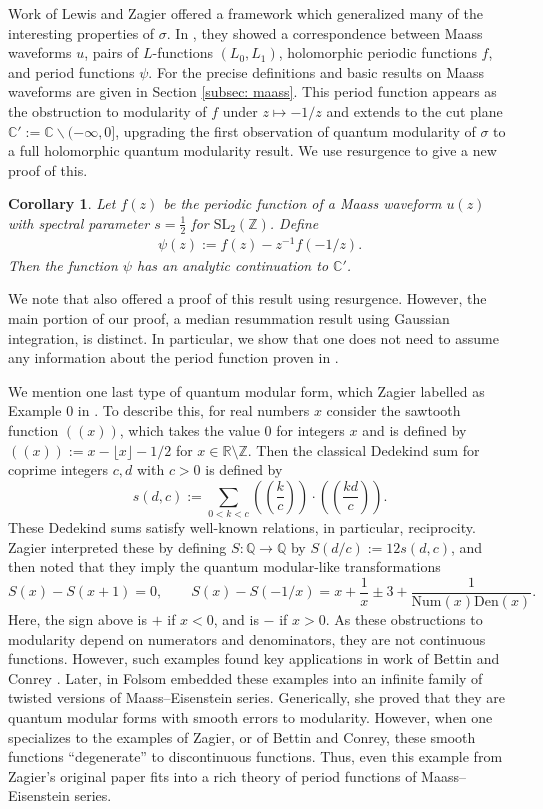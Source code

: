 \documentclass[12pt]{amsart}
\theoremstyle{definition}
\theoremstyle{plain}
\newtheorem{cor}[theorem]{Corollary}
\newcommand{\Z}{\mathbb{Z}}
\newcommand{\Q}{\mathbb{Q}}
\newcommand{\R}{\mathbb{R}}
\numberwithin{equation}{section}
\begin{document}
Work of Lewis and Zagier offered a framework which generalized many of the interesting properties of $\sigma$. In \cite{lewis-zagier}, they showed a correspondence between Maass waveforms $u$, pairs of $L$-functions $(L_0,L_1)$, holomorphic periodic functions $f$, and period functions $\psi$. For the precise definitions and basic results on Maass waveforms are given in Section \ref{subsec: maass}. This period function appears as the obstruction to modularity of $f$ under $z \mapsto -1/z$ and extends to the cut plane $\mathbb{C}':=\mathbb{C}\backslash (-\infty,0]$, upgrading the first observation of quantum modularity of $\sigma$ to a full holomorphic quantum modularity result. We use resurgence to give a new proof of this.

\begin{cor}
Let $f(z)$ be the periodic function of a Maass waveform $u(z)$ with spectral parameter $s= \frac{1}{2}$ for $\mathrm{SL}_2(\mathbb{Z})$. Define
\begin{align*}
	\psi(z):= f(z)  -  z^{-1}f(-1/z). 
\end{align*}
	Then the function $\psi$ has an analytic continuation to $\mathbb{C}'$. 
\end{cor}

We note that \cite{fantini-rella} also offered a proof of this result using resurgence. However, the main portion of our proof, a median resummation result using Gaussian integration, is distinct. In particular, we show that one does not need to assume any information about the period function proven in \cite{lewis-zagier}. 

We mention one last type of quantum modular form, which Zagier labelled as Example 0 in \cite{zagier-quantum}. To describe this, for real numbers $x$ consider the sawtooth function $((x))$, which takes the value $0$ for integers $x$ and is defined by $((x)):=x-\lfloor x\rfloor-1/2$ for $x\in\R\setminus\Z$. Then the classical Dedekind sum for coprime integers $c,d$ with $c>0$ is defined by 
\[
s(d,c):=\sum_{0<k<c}\left(\left(\frac{k}c\right)\right)\cdot\left(\left(\frac{kd}c\right)\right).
\]
These Dedekind sums satisfy well-known relations, in particular, reciprocity. Zagier interpreted these by defining $S\colon\Q\rightarrow\Q$ by $S(d/c):=12s(d,c)$, and then noted that they imply the quantum modular-like transformations
\[
S(x)-S(x+1)=0,\quad\quad S(x)-S(-1/x)=x+\frac1x\pm 3+\frac{1}{\mathrm{Num}(x)\mathrm{Den}(x)}.
\]
Here, the sign above is $+$ if $x<0$, and is $-$ if $x>0$. As these obstructions to modularity depend on numerators and denominators, they are not continuous functions. However, such examples found key applications in work of Bettin and Conrey \cite{bettin-conrey}. Later, in \cite{folsom-cotangent-sums} Folsom embedded these examples into an infinite family of twisted versions of Maass--Eisenstein series. Generically, she proved that they are quantum modular forms with smooth errors to modularity. However, when one specializes to the examples of Zagier, or of Bettin and Conrey, these smooth functions ``degenerate'' to discontinuous functions. Thus, even this example from Zagier's original paper fits into a rich theory of period functions of Maass--Eisenstein series. 
\end{document}
